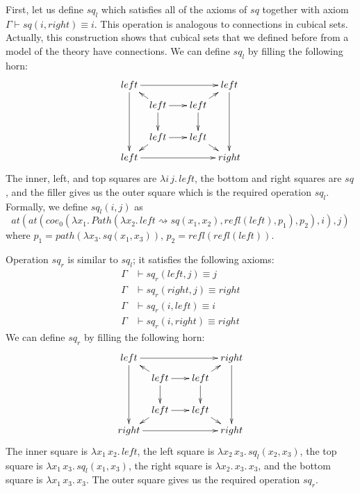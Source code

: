 \documentclass{mscs}
\newcommand{\deq}{\equiv}
\newcommand{\idtype}{\rightsquigarrow}
\numberwithin{figure}{section}
\begin{document}
First, let us define $sq_l$ which satisfies all of the axioms of $sq$ together with axiom $\Gamma \vdash sq(i,right) \deq i$.
This operation is analogous to connections in cubical sets.
Actually, this construction shows that cubical sets that we defined before from a model of the theory have connections.
We can define $sq_l$ by filling the following horn:
\[ \xymatrix @C=0.5pc @R=0.5pc
    { left \ar[rrrr] \ar[dddd] &          & &                      & left \ar[dddd] \\
           & left \ar[rr] \ar[dd] \ar[ul] & & left \ar[dd] \ar[ur] & \\
           &                              & &                      & \\
           & left \ar[rr] \ar[dl]         & & left \ar[dr]         & \\
      left \ar[rrrr]           &          & &                      & right
    }\]
The inner, left, and top squares are $\lambda i\,j.\,left$, the bottom and right squares are $sq$,
and the filler gives us the outer square which is the required operation $sq_l$.
Formally, we define $sq_l(i,j)$ as
\[ at(at(coe_0(\lambda x_1.\,Path(\lambda x_2.\,left \idtype sq(x_1,x_2), refl(left), p_1), p_2),i),j) \]
where $p_1 = path(\lambda x_3.\,sq(x_1,x_3))$, $p_2 = refl(refl(left))$.

Operation $sq_r$ is similar to $sq_l$; it satisfies the following axioms:
\begin{align*}
\Gamma & \vdash sq_r(left,j) \deq j \\
\Gamma & \vdash sq_r(right,j) \deq right \\
\Gamma & \vdash sq_r(i,left) \deq i \\
\Gamma & \vdash sq_r(i,right) \deq right
\end{align*}
We can define $sq_r$ by filling the following horn:
\[ \xymatrix @C=0.5pc @R=0.5pc
    { left \ar[rrrr] \ar[dddd] &          & &                      & right \ar[dddd] \\
           & left \ar[rr] \ar[dd] \ar[ul] & & left \ar[dd] \ar[ur] & \\
           &                              & &                      & \\
           & left \ar[rr] \ar[dl]         & & left \ar[dr]         & \\
      right \ar[rrrr]           &         & &                      & right
    }\]
The inner square is $\lambda x_1\,x_2.\,left$, the left square is $\lambda x_2\,x_3.\,sq_l(x_2,x_3)$,
the top square is $\lambda x_1\,x_3.\,sq_l(x_1,x_3)$, the right square is $\lambda x_2.\,x_3.\,x_3$,
and the bottom square is $\lambda x_1\,x_3.\,x_3$.
The outer square gives us the required operation $sq_r$.
\end{document}
